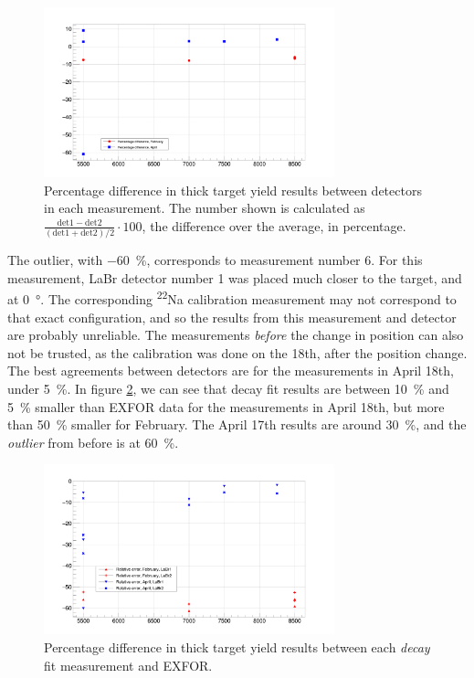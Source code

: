 \documentclass[a4paper,12pt]{report}
\newcommand{\Na}{\textsuperscript{22}Na }
\begin{document}
\begin{figure}[H]
	\centering
	\includegraphics[width=0.75\textwidth]{decay_errors_rel_per.png}
	\caption{Percentage difference in thick target yield results between detectors in each measurement.
	The number shown is calculated as $\frac{\text{det}1-\text{det}2}{\left(\text{det}1+\text{det}2\right)/2}\cdot 100$, the difference over the average, in percentage.}
	\label{decay_errors_rel_per}
\end{figure}

The outlier, with \qty{-60}{\percent}, corresponds to measurement number 6.
For this measurement, LaBr detector number 1 was placed much closer to the target, and at \qty{0}{\degree}.
The corresponding \Na calibration measurement may not correspond to that exact configuration, and so the results from this measurement and detector are probably unreliable.
The measurements \emph{before} the change in position can also not be trusted, as the calibration was done on the 18th, after the position change.
\\

The best agreements between detectors are for the measurements in April 18th, under \qty{5}{\percent}.
In figure \ref{decay_errors_per}, we can see that decay fit results are between \qty{10}{\percent} and \qty{5}{\percent} smaller than EXFOR data for the measurements in April 18th, but more than \qty{50}{\percent} smaller for February.
The April 17th results are around \qty{30}{\percent}, and the \textit{outlier} from before is at \qty{60}{\percent}.

\begin{figure}[H]
	\centering
	\includegraphics[width=0.75\textwidth]{decay_errors_per.png}
	\caption{Percentage difference in thick target yield results between each \textit{decay} fit measurement and EXFOR.}
	\label{decay_errors_per}
\end{figure}
\end{document}
